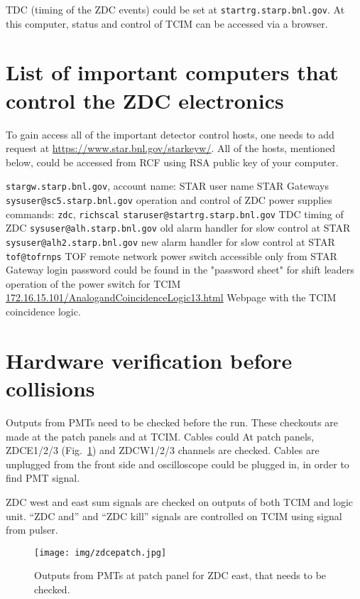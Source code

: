 TDC (timing of the ZDC events) could be set at \texttt{startrg.starp.bnl.gov}. At this computer, status and control of TCIM can be accessed via a browser.

\section{List of important computers that control the ZDC electronics}

To gain access all of the important detector control hosts, one needs to add request at \url{https://www.star.bnl.gov/starkeyw/}. All of the hosts, mentioned below, could be accessed from RCF using RSA public key of your computer.
\begin{outline}
 \1 \texttt{stargw.starp.bnl.gov}, account name: STAR user name
  \2 STAR Gateways
 \1 \texttt{sysuser@sc5.starp.bnl.gov} 
  \2 operation and control of ZDC power supplies
  \2 commands: \texttt{zdc}, \texttt{richscal}
 \1 \texttt{staruser@startrg.starp.bnl.gov}
   \2 TDC timing of ZDC
 \1 \texttt{sysuser@alh.starp.bnl.gov} 
   \2 old alarm handler for slow control at STAR
 \1 \texttt{sysuser@alh2.starp.bnl.gov}
   \2 new alarm handler for slow control at STAR
 \1 \texttt{tof@tofrnps}
   \2 TOF remote network power switch
   \2 accessible only from STAR Gateway
   \2 login password could be found in the "password sheet" for shift leaders
   \2 operation of the power switch for TCIM
 \1 \url{172.16.15.101/AnalogandCoincidenceLogic13.html}
   \2 Webpage with the TCIM coincidence logic.
\end{outline}
 
\section{Hardware verification before collisions}
Outputs from PMTs need to be checked before the run. These checkouts are made at the patch panels and at TCIM. Cables could 
At patch panels, ZDCE1/2/3 (Fig.~\ref{zdcepatch}) and ZDCW1/2/3 channels are checked. Cables are unplugged from the front side and oscilloscope could be plugged in, in order to find PMT signal.

ZDC west and east sum signals are checked on outputs of both TCIM and logic unit. ``ZDC and'' and ``ZDC kill'' signals are controlled on TCIM using  signal from pulser.

\begin{figure}[htb]
\begin{center}
\texttt{[image: img/zdcepatch.jpg]}
\end{center}
\caption{Outputs from PMTs at patch panel for ZDC east, that needs to be checked.}
\label{zdcepatch}
\end{figure}




